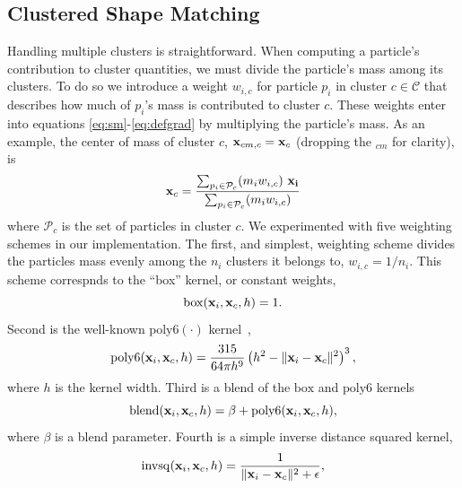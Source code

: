 \documentclass[review]{acmsiggraph}
\begin{document}
\subsection{Clustered Shape Matching}
Handling multiple clusters is straightforward.  When computing a particle's contribution to 
cluster quantities, we must divide the particle's mass among its clusters.  To do 
so we introduce a weight $w_{i,c}$ for particle $p_i$ in cluster $c\in\mathcal{C}$ that describes how much of
$p_i$'s mass is contributed to cluster $c$.  These weights enter into equations \eqref{eq:sm}-\eqref{eq:defgrad} by multiplying
the particle's mass.  As an example, the center of mass of cluster $c$, $\mathit{\mathbf{x}}_{cm,c} = \mathit{\mathbf{x}}_{c}$ (dropping the $_{cm}$ for clarity), is
\begin{equation}
\label{eq:com}
\B{x}_{c} = \frac{\sum_{p_i\in\mathcal{P}_c}(m_iw_{i,c})~\B{x_i}}{\sum_{p_i\in\mathcal{P}_c}(m_iw_{i,c})}%
\end{equation}
where $\mathcal{P}_c$ is the set of particles in cluster $c$.
We experimented with five weighting schemes in our implementation.  The first, and simplest, weighting
scheme divides the particles mass evenly among the $n_i$ clusters it belongs to, $w_{i,c} = 1/n_i$.
This scheme correspnds to the ``box'' kernel, or constant weights,
\begin{equation}
\label{eq:box}
\mathrm{box}(\mathit{\mathbf{x}}_i, \mathit{\mathbf{x}}_{c}, h) = 1.
\end{equation}
Second is the well-known $\mathrm{poly6}(\cdot)$ kernel~\cite{Mueller:2003:PFS},
\begin{equation}
\label{eq:poly6}
\mathrm{poly6}(\mathit{\mathbf{x}}_i, \mathit{\mathbf{x}}_{c}, h) = \frac{315}{64\pi h^9}\left(h^2-\|\mathit{\mathbf{x}}_i-\mathit{\mathbf{x}}_{c}\|^2\right)^3,
\end{equation}
where $h$ is the kernel width.
Third is a blend of the $\mathrm{box}$ and $\mathrm{poly6}$ kernels
\begin{equation}
\label{blend}
\mathrm{blend}(\mathit{\mathbf{x}}_i, \mathit{\mathbf{x}}_{c}, h) = \beta + \mathrm{poly6}(\mathit{\mathbf{x}}_i, \mathit{\mathbf{x}}_{c}, h),
\end{equation}
where $\beta$ is a blend parameter.
Fourth is a simple inverse distance squared kernel,
\begin{equation}
\label{eq:invdistancesquared}
\mathrm{invsq}(\mathit{\mathbf{x}}_i, \mathit{\mathbf{x}}_{c}, h) = \frac{1}{\|\mathit{\mathbf{x}}_i-\mathit{\mathbf{x}}_{c}\|^2+\epsilon},
\end{equation}
\end{document}
